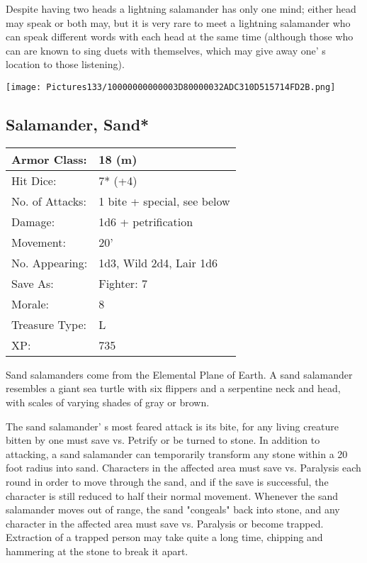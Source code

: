 \documentclass[a4paper,twoside,openany,10pt]{book}
\begin{document}
\begin{multicols}{2}
Despite having two heads a lightning salamander has only one mind; either head may speak or both may, but it is very rare to meet a lightning salamander who can speak different words with each head at the same time (although those who can are known to sing duets with themselves, which may give away one' s location to those listening).

\vfill

\begin{center} \texttt{[image: Pictures133/10000000000003D80000032ADC310D515714FD2B.png]} \end{center}


\subsection*{Salamander, Sand*}\label{salamander-sand}

\begin{tabularx}{0.50\textwidth}{@{}lX@{}}
Armor Class: & 18 (m) \\\hline
Hit Dice: & 7* (+4) \\\hline
No. of Attacks: & 1 bite + special, see below \\\hline
Damage: & 1d6 + petrification \\\hline
Movement: & 20' \\\hline
No. Appearing: & 1d3, Wild 2d4, Lair 1d6 \\\hline
Save As: & Fighter: 7 \\\hline
Morale: & 8 \\\hline
Treasure Type: & L \\\hline
XP: & 735 \\\hline
\end{tabularx}

Sand salamanders come from the Elemental Plane of Earth. A sand salamander resembles a giant sea turtle with six flippers and a serpentine neck and head, with scales of varying shades of gray or brown.

The sand salamander' s most feared attack is its bite, for any living creature bitten by one must save vs. Petrify or be turned to stone. In addition to attacking, a sand salamander can temporarily transform any stone within a 20 foot radius into sand. Characters in the affected area must save vs. Paralysis each round in order to move through the sand, and if the save is successful, the character is still reduced to half their normal movement. Whenever the sand salamander moves out of range, the sand "congeals" back into stone, and any character in the affected area must save vs. Paralysis or become trapped. Extraction of a trapped person may take quite a long time, chipping and hammering at the stone to break it apart.


\end{multicols}
\end{document}
